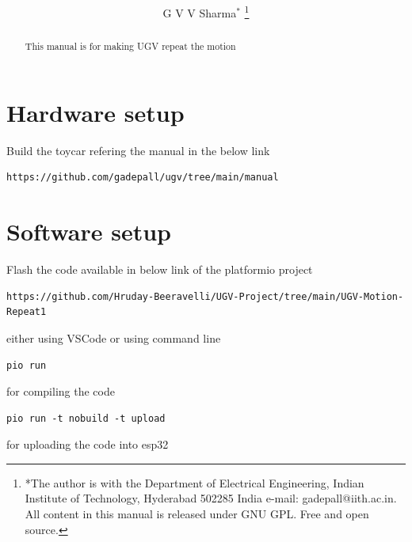 \documentclass[journal,12pt,twocolumn]{IEEEtran}
\begin{document}
\let\StandardTheFigure\thefigure
\let\StandardTheTable\thetable

\def\putbox#1#2#3{\makebox[0in][l]{\makebox[#1][l]{}\raisebox{\baselineskip}[0in][0in]{\raisebox{#2}[0in][0in]{#3}}}}
     \def\rightbox#1{\makebox[0in][r]{#1}}
     \def\centbox#1{\makebox[0in]{#1}}
     \def\topbox#1{\raisebox{-\baselineskip}[0in][0in]{#1}}
     \def\midbox#1{\raisebox{-0.5\baselineskip}[0in][0in]{#1}}

\vspace{3cm}

\title{ 
}
 \author{G V V Sharma$^{*}$%
 \thanks{*The author is with the Department
 of Electrical Engineering, Indian Institute of Technology, Hyderabad
 502285 India e-mail:  gadepall@iith.ac.in. All content in this manual is released under GNU GPL. Free and open source.}%
}
\maketitle

\tableofcontents

\bigskip

\begin{abstract}
This manual is for making UGV repeat the motion  
\end{abstract}
\IEEEpeerreviewmaketitle

\section{Hardware setup}
Build the toycar refering the manual in the below link
\begin{lstlisting}
https://github.com/gadepall/ugv/tree/main/manual
\end{lstlisting}
% 
\section{Software setup}
Flash the code available in below link of the platformio project 
\begin{lstlisting}
https://github.com/Hruday-Beeravelli/UGV-Project/tree/main/UGV-Motion-Repeat1
\end{lstlisting}
either using VSCode or using command line
\begin{lstlisting}
pio run
\end{lstlisting}
for compiling the code
\begin{lstlisting}
pio run -t nobuild -t upload
\end{lstlisting}
for uploading the code into esp32
\end{document}
